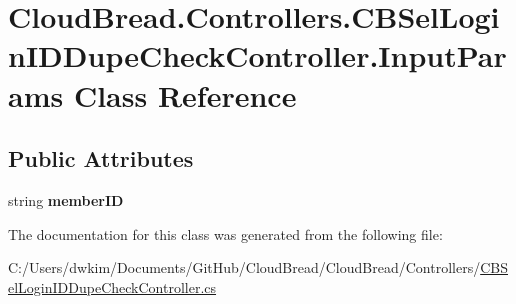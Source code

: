 \hypertarget{a00091}{}\section{Cloud\+Bread.\+Controllers.\+C\+B\+Sel\+Login\+I\+D\+Dupe\+Check\+Controller.\+Input\+Params Class Reference}
\label{a00091}
\subsection*{Public Attributes}
\begin{DoxyCompactItemize}
\item 
string {\bfseries member\+ID}\hypertarget{a00091_a643c0f95adab9043328a75b0da7b3739}{}\label{a00091_a643c0f95adab9043328a75b0da7b3739}

\end{DoxyCompactItemize}


The documentation for this class was generated from the following file\+:\begin{DoxyCompactItemize}
\item 
C\+:/\+Users/dwkim/\+Documents/\+Git\+Hub/\+Cloud\+Bread/\+Cloud\+Bread/\+Controllers/\hyperlink{a00221}{C\+B\+Sel\+Login\+I\+D\+Dupe\+Check\+Controller.\+cs}\end{DoxyCompactItemize}
